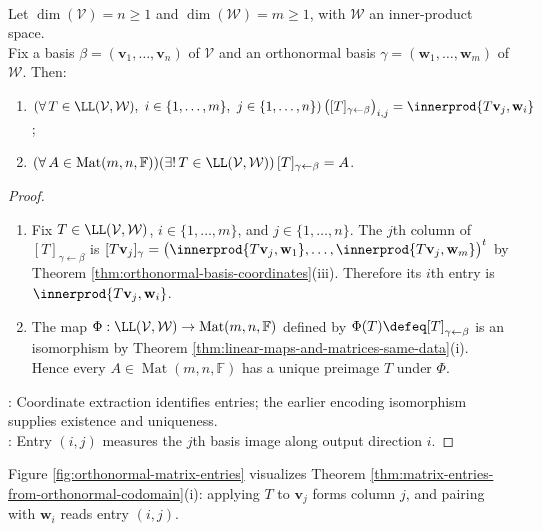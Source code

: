 \begin{theorem} \label{thm:matrix-entries-from-orthonormal-codomain} \\
Let $\dim(\mathcal{V})=n\geq1$ and $\dim(\mathcal{W})=m\geq1$, with $\mathcal{W}$ an inner-product space.\\
Fix a basis $\beta=(\mathbf{v}_1,\ldots,\mathbf{v}_n)$ of $\mathcal{V}$ and an orthonormal basis $\gamma=(\mathbf{w}_1,\ldots,\mathbf{w}_m)$ of $\mathcal{W}$. Then:
\begin{enumerate}[label=(\roman*)]
\setlength{\itemsep}{0pt}
\item $(\forall\,T\in\LL(\mathcal{V},\mathcal{W}),\ i\in\{1,\ldots,m\},\ j\in\{1,\ldots,n\})\,\bigl([T]_{\gamma\leftarrow\beta}\bigr)_{i,j}=\innerprod{T\mathbf{v}_j,\mathbf{w}_i}$;
\item $(\forall\,A\in\operatorname{Mat}(m,n,\mathbb{F}))(\exists!\,T\in\LL(\mathcal{V},\mathcal{W}))\,[T]_{\gamma\leftarrow\beta}=A$.
\end{enumerate}
\begin{proof}
\begin{enumerate}[label=(\roman*)]
\setlength{\itemsep}{0pt}
\item Fix $T\in\LL(\mathcal{V},\mathcal{W})$, $i\in\{1,\ldots,m\}$, and $j\in\{1,\ldots,n\}$. The $j$th column of $[T]_{\gamma\leftarrow\beta}$ is $[T\mathbf{v}_j]_{\gamma}=\bigl(\innerprod{T\mathbf{v}_j,\mathbf{w}_1},\ldots,\innerprod{T\mathbf{v}_j,\mathbf{w}_m}\bigr)^t$ by Theorem \ref{thm:orthonormal-basis-coordinates}(iii). Therefore its $i$th entry is $\innerprod{T\mathbf{v}_j,\mathbf{w}_i}$.
\item The map $\Phi:\LL(\mathcal{V},\mathcal{W})\to\operatorname{Mat}(m,n,\mathbb{F})$ defined by $\Phi(T)\defeq[T]_{\gamma\leftarrow\beta}$ is an isomorphism by Theorem \ref{thm:linear-maps-and-matrices-same-data}(i).\\
Hence every $A\in\operatorname{Mat}(m,n,\mathbb{F})$ has a unique preimage $T$ under $\Phi$.
\end{enumerate}
: Coordinate extraction identifies entries; the earlier encoding isomorphism supplies existence and uniqueness.\\
: Entry $(i,j)$ measures the $j$th basis image along output direction $i$.
\end{proof}
\end{theorem}

Figure \ref{fig:orthonormal-matrix-entries} visualizes Theorem \ref{thm:matrix-entries-from-orthonormal-codomain}(i): applying $T$ to $\mathbf{v}_j$ forms column $j$, and pairing with $\mathbf{w}_i$ reads entry $(i,j)$.

